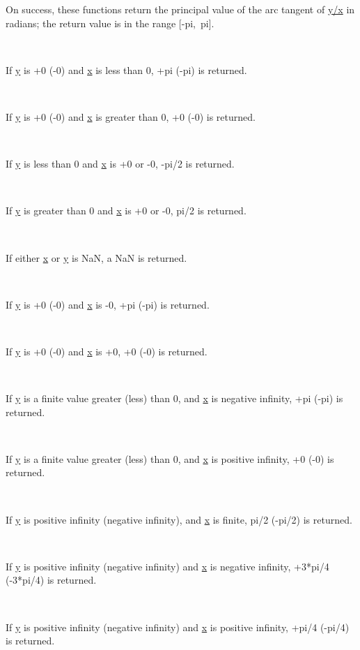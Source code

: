 \documentclass[]{article}
\renewcommand{\emph}[1]{\underline{#1}}
\begin{document}

On success, these functions return the principal value of the arc
tangent of \emph{y/x} in radians; the return value is in the range
{[}-pi,~pi{]}.

~

If \emph{y} is +0 (-0) and \emph{x} is less than 0, +pi (-pi) is
returned.

~

If \emph{y} is +0 (-0) and \emph{x} is greater than 0, +0 (-0) is
returned.

~

If \emph{y} is less than 0 and \emph{x} is +0 or -0, -pi/2 is returned.

~

If \emph{y} is greater than 0 and \emph{x} is +0 or -0, pi/2 is
returned.

~

If either \emph{x} or \emph{y} is NaN, a NaN is returned.

~

If \emph{y} is +0 (-0) and \emph{x} is -0, +pi (-pi) is returned.

~

If \emph{y} is +0 (-0) and \emph{x} is +0, +0 (-0) is returned.

~

If \emph{y} is a finite value greater (less) than 0, and \emph{x} is
negative infinity, +pi (-pi) is returned.

~

If \emph{y} is a finite value greater (less) than 0, and \emph{x} is
positive infinity, +0 (-0) is returned.

~

If \emph{y} is positive infinity (negative infinity), and \emph{x} is
finite, pi/2 (-pi/2) is returned.

~

If \emph{y} is positive infinity (negative infinity) and \emph{x} is
negative infinity, +3*pi/4 (-3*pi/4) is returned.

~

If \emph{y} is positive infinity (negative infinity) and \emph{x} is
positive infinity, +pi/4 (-pi/4) is returned.

\end{document}

